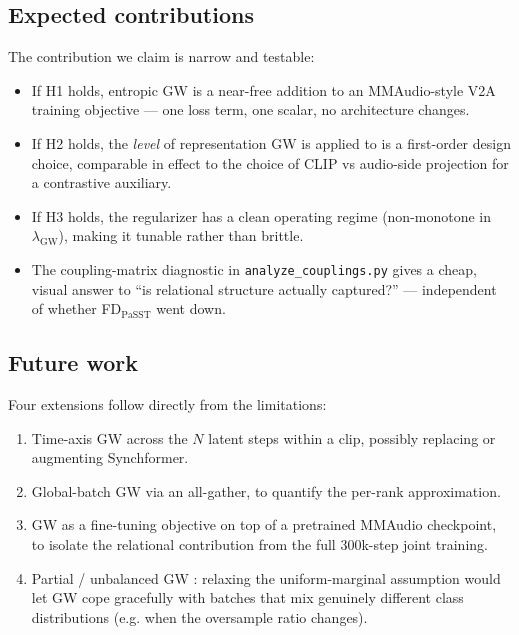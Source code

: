 \subsection{Expected contributions}
The contribution we claim is narrow and testable:
\begin{itemize}[leftmargin=*,topsep=2pt]
  \item If H1 holds, entropic GW is a near-free addition to an
    MMAudio-style V2A training objective --- one loss term, one
    scalar, no architecture changes.
  \item If H2 holds, the \emph{level} of representation GW is
    applied to is a first-order design choice, comparable in
    effect to the choice of CLIP vs audio-side projection for a
    contrastive auxiliary.
  \item If H3 holds, the regularizer has a clean operating
    regime (non-monotone in $\lambda_{\mathrm{GW}}$), making it
    tunable rather than brittle.
  \item The coupling-matrix diagnostic in
    \texttt{analyze\_couplings.py} gives a cheap, visual answer
    to ``is relational structure actually captured?'' ---
    independent of whether FD$_{\text{PaSST}}$ went down.
\end{itemize}

\subsection{Future work}
Four extensions follow directly from the limitations:
\begin{enumerate}[leftmargin=*]
  \item Time-axis GW across the $N$ latent steps within a clip,
    possibly replacing or augmenting Synchformer.
  \item Global-batch GW via an all-gather, to quantify the
    per-rank approximation.
  \item GW as a fine-tuning objective on top of a pretrained
    MMAudio checkpoint, to isolate the relational contribution
    from the full 300k-step joint training.
  \item Partial / unbalanced GW \citep{chapel2020partial}:
    relaxing the uniform-marginal assumption would let GW cope
    gracefully with batches that mix genuinely different class
    distributions (e.g. when the oversample ratio changes).
\end{enumerate}
